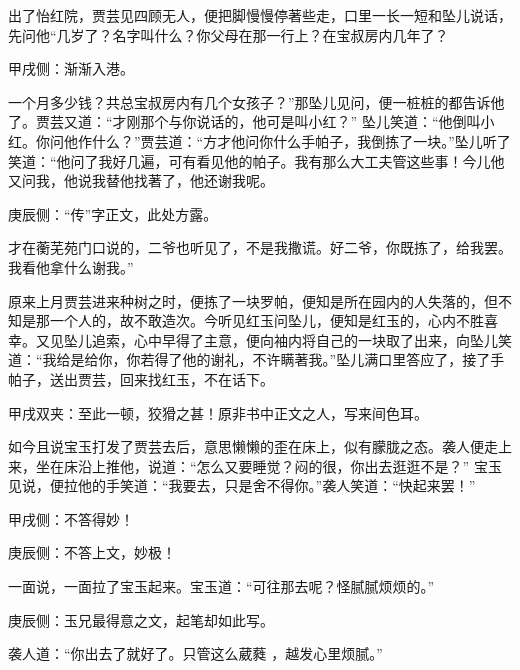 \begin{parag}
    出了怡红院，贾芸见四顾无人，便把脚慢慢停著些走，口里一长一短和坠儿说话，先问他“几岁了？名字叫什么？你父母在那一行上？在宝叔房内几年了？\begin{note}甲戌侧：渐渐入港。\end{note}一个月多少钱？共总宝叔房内有几个女孩子？”那坠儿见问，便一桩桩的都告诉他了。贾芸又道：“才刚那个与你说话的，他可是叫小红？” 坠儿笑道：“他倒叫小红。你问他作什么？”贾芸道：“方才他问你什么手帕子，我倒拣了一块。”坠儿听了笑道：“他问了我好几遍，可有看见他的帕子。我有那么大工夫管这些事！今儿他又问我，他说我替他找著了，他还谢我呢。\begin{note}庚辰侧：“传”字正文，此处方露。\end{note}才在蘅芜苑门口说的，二爷也听见了，不是我撒谎。好二爷，你既拣了，给我罢。我看他拿什么谢我。”
\end{parag}


\begin{parag}
    原来上月贾芸进来种树之时，便拣了一块罗帕，便知是所在园内的人失落的，但不知是那一个人的，故不敢造次。今听见红玉问坠儿，便知是红玉的，心内不胜喜幸。又见坠儿追索，心中早得了主意，便向袖内将自己的一块取了出来，向坠儿笑道：“我给是给你，你若得了他的谢礼，不许瞒著我。”坠儿满口里答应了，接了手帕子，送出贾芸，回来找红玉，不在话下。\begin{note}甲戌双夹：至此一顿，狡猾之甚！原非书中正文之人，写来间色耳。\end{note}
\end{parag}


\begin{parag}
    如今且说宝玉打发了贾芸去后，意思懒懒的歪在床上，似有朦胧之态。袭人便走上来，坐在床沿上推他，说道：“怎么又要睡觉？闷的很，你出去逛逛不是？” 宝玉见说，便拉他的手笑道：“我要去，只是舍不得你。”袭人笑道：“快起来罢！”\begin{note}甲戌侧：不答得妙！\end{note}\begin{note}庚辰侧：不答上文，妙极！\end{note}一面说，一面拉了宝玉起来。宝玉道：“可往那去呢？怪腻腻烦烦的。”\begin{note}庚辰侧：玉兄最得意之文，起笔却如此写。\end{note}袭人道：“你出去了就好了。只管这么葳蕤 ，越发心里烦腻。”
\end{parag}


